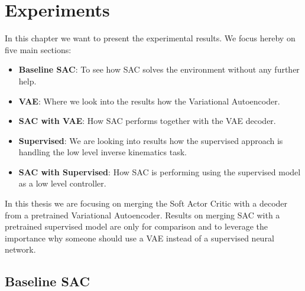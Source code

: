 \chapter{Experiments}\label{chap:experiments}

In this chapter we want to present the experimental results. We focus hereby on five main sections:
\begin{itemize}
    \item \textbf{Baseline SAC}: To see how SAC solves the environment without any further help.
    \item \textbf{VAE}: Where we look into the results how the Variational Autoencoder.
    \item \textbf{SAC with VAE}: How SAC performs together with the VAE decoder.
    \item \textbf{Supervised}: We are looking into results how the supervised approach is handling the low level inverse kinematics task.
    \item \textbf{SAC with Supervised}: How SAC is performing using the supervised model as a low level controller.
\end{itemize}

In this thesis we are focusing on merging the Soft Actor Critic with a decoder from a pretrained Variational Autoencoder. Results on merging SAC with a pretrained supervised model are only for comparison and to leverage the importance why someone should use a VAE instead of a supervised neural network.

\section{Baseline SAC}

